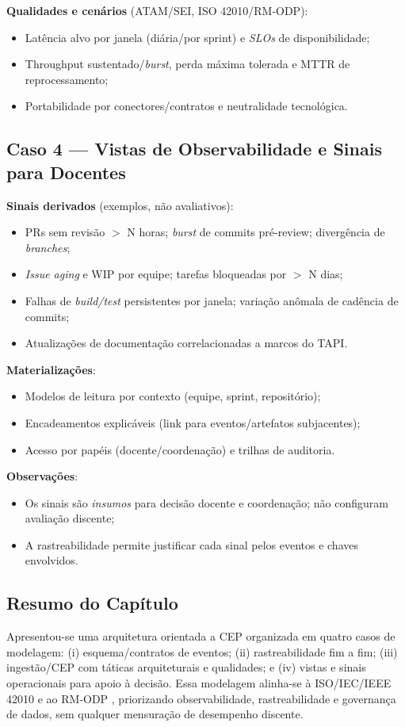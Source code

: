 \textbf{Qualidades e cenários} (ATAM/SEI, ISO 42010/RM‑ODP):
\begin{itemize}
  \item Latência alvo por janela (diária/por sprint) e \textit{SLOs} de disponibilidade;
  \item Throughput sustentado/\textit{burst}, perda máxima tolerada e MTTR de reprocessamento;
  \item Portabilidade por conectores/contratos e neutralidade tecnológica.
\end{itemize}

\subsection{Caso 4 — Vistas de Observabilidade e Sinais para Docentes}

\textbf{Sinais derivados} (exemplos, não avaliativos):
\begin{itemize}
  \item PRs sem revisão \(>\) N horas; \textit{burst} de commits pré-review; divergência de \textit{branches};
  \item \textit{Issue aging} e WIP por equipe; tarefas bloqueadas por \(>\) N dias;
  \item Falhas de \textit{build/test} persistentes por janela; variação anômala de cadência de commits;
  \item Atualizações de documentação correlacionadas a marcos do TAPI.
\end{itemize}

\textbf{Materializações}:
\begin{itemize}
  \item Modelos de leitura por contexto (equipe, sprint, repositório);
  \item Encadeamentos explicáveis (link para eventos/artefatos subjacentes);
  \item Acesso por papéis (docente/coordenação) e trilhas de auditoria.
\end{itemize}

\textbf{Observações}:
\begin{itemize}
  \item Os sinais são \textit{insumos} para decisão docente e coordenação; não configuram avaliação discente;
  \item A rastreabilidade permite justificar cada sinal pelos eventos e chaves envolvidos.
\end{itemize}

\subsection{Resumo do Capítulo}

Apresentou-se uma arquitetura orientada a CEP organizada em quatro casos de modelagem: (i) esquema/contratos de eventos; (ii) rastreabilidade fim a fim; (iii) ingestão/CEP com táticas arquiteturais e qualidades; e (iv) vistas e sinais operacionais para apoio à decisão. Essa modelagem alinha-se à ISO/IEC/IEEE 42010 \cite{iso42010} e ao RM‑ODP \cite{iso10746}, priorizando observabilidade, rastreabilidade e governança de dados, sem qualquer mensuração de desempenho discente.
